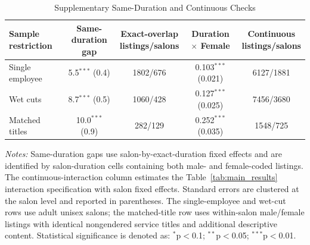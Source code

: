 
\begin{table}[htbp]
  \centering
  \caption{Supplementary Same-Duration and Continuous Checks}
  \label{tab:combined_robustness_results}
  \footnotesize

\begin{tabular}{lcccc}
\hline
Sample restriction & Same-duration gap & \makecell{Exact-overlap\\listings/salons} & Duration $\times$ Female & \makecell{Continuous\\listings/salons} \\
\hline
Single employee & 5.5$^{***}$ (0.4) & 1802/676 & 0.103$^{***}$ (0.021) & 6127/1881 \\
Wet cuts & 8.7$^{***}$ (0.5) & 1060/428 & 0.127$^{***}$ (0.025) & 7456/3680 \\
Matched titles & 10.0$^{***}$ (0.9) & 282/129 & 0.252$^{***}$ (0.035) & 1548/725 \\
\hline
\end{tabular}

  \begin{minipage}{0.96\linewidth}
      \footnotesize
      \textit{Notes:} Same-duration gaps use salon-by-exact-duration fixed effects and are identified by salon-duration cells containing both male- and female-coded listings.
      The continuous-interaction column estimates the Table~\ref{tab:main_results} interaction specification with salon fixed effects.
      Standard errors are clustered at the salon level and reported in parentheses.
      The single-employee and wet-cut rows use adult unisex salons; the matched-title row uses within-salon male/female listings with identical nongendered service titles and additional descriptive content.
      Statistical significance is denoted as: $^{*}$p$<$0.1; $^{**}$p$<$0.05; $^{***}$p$<$0.01.
  \end{minipage}\end{table}
